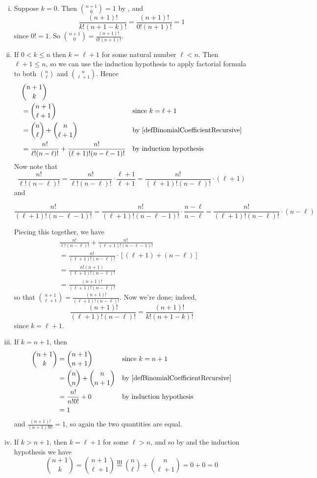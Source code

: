 \begin{cproof}
\begin{itemize}
\begin{enumerate}[(i)]
\item Suppose $k=0$. Then $\binom{n+1}{0} = 1$ by , and
\[ \frac{(n+1)!}{k!(n+1-k)!} = \frac{(n+1)!}{0!(n+1)!} = 1 \]
since $0!=1$. So $\binom{n+1}{0} = \frac{(n+1)!}{0!(n+1)!}$.
\item If $0 < k \le n$ then $k=\ell+1$ for some natural number $\ell < n$. Then $\ell+1 \le n$, so we can use the induction hypothesis to apply factorial formula to both $\binom{n}{\ell}$ and $\binom{n}{\ell+1}$. Hence
\begin{align*}
&\binom{n+1}{k} && \\
&= \binom{n+1}{\ell+1} && \text{since $k=\ell+1$} \\
&= \binom{n}{\ell} + \binom{n}{\ell+1} && \text{by \Cref{defBinomialCoefficientRecursive}} \\
&= \frac{n!}{\ell!(n-\ell)!} + \frac{n!}{(\ell+1)!(n-\ell-1)!} && \text{by induction hypothesis}
\end{align*}
Now note that
\[ \frac{n!}{\ell!(n-\ell)!} = \frac{n!}{\ell!(n-\ell)!} \cdot \frac{\ell+1}{\ell+1} = \frac{n!}{(\ell+1)!(n-\ell)!} \cdot (\ell+1) \]
and
\begin{center}
$\dfrac{n!}{(\ell+1)!(n-\ell-1)!} = \dfrac{n!}{(\ell+1)!(n-\ell-1)!} \cdot \dfrac{n-\ell}{n-\ell} = \dfrac{n!}{(\ell+1)!(n-\ell)!} \cdot (n-\ell)$
\end{center}

Piecing this together, we have
\begin{align*}
&\frac{n!}{\ell!(n-\ell)!} + \frac{n!}{(\ell+1)!(n-\ell-1)!} && \\
&= \frac{n!}{(\ell+1)!(n-\ell)!} \cdot [(\ell+1) + (n-\ell)] \\
&= \frac{n!(n+1)}{(\ell+1)!(n-\ell)!} && \\
&= \frac{(n+1)!}{(\ell+1)!(n-\ell)!}
\end{align*}
so that $\binom{n+1}{\ell+1} = \frac{(n+1)!}{(\ell+1)!(n-\ell)!}$. Now we're done; indeed,
\[ \frac{(n+1)!}{(\ell+1)!(n-\ell)!} = \frac{(n+1)!}{k!(n+1-k)!} \]
since $k=\ell+1$.
\item If $k=n+1$, then
\begin{align*}
\binom{n+1}{k} &= \binom{n+1}{n+1} && \text{since $k=n+1$} \\
&= \binom{n}{n} + \binom{n}{n+1} && \text{by \Cref{defBinomialCoefficientRecursive}} \\
&= \frac{n!}{n!0!} + 0 && \text{by induction hypothesis} \\
&= 1
\end{align*}
and $\frac{(n+1)!}{(n+1)!0!}=1$, so again the two quantities are equal.
\item If $k>n+1$, then $k=\ell+1$ for some $\ell > n$, and so by  and the induction hypothesis we have
\[ \binom{n+1}{k} = \binom{n+1}{\ell+1} \overset{\text{IH}}{=} \binom{n}{\ell}+\binom{n}{\ell+1} = 0+0 = 0 \]

\end{enumerate}
\end{itemize}
\end{cproof}

